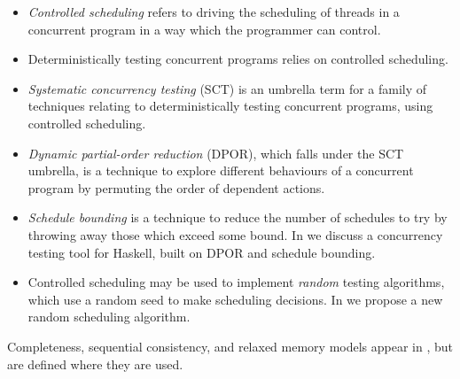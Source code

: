 \begin{itemize}
\item \emph{Controlled scheduling} refers to driving the scheduling of
  threads in a concurrent program in a way which the programmer can
  control.
\item Deterministically testing concurrent programs relies on
  controlled scheduling.
\item \emph{Systematic concurrency testing}
  (SCT)\cite{coons2013,flanagan2005,musuvathi2008,musuvathi2007} is an
  umbrella term for a family of techniques relating to
  deterministically testing concurrent programs, using controlled
  scheduling.
\item \emph{Dynamic partial-order reduction}
  (DPOR)\cite{flanagan2005,godefroid1996}, which falls under the SCT
  umbrella, is a technique to explore different behaviours of a
  concurrent program by permuting the order of dependent actions.
\item \emph{Schedule bounding}\cite{emmi2011,musuvathi2008,musuvathi2007} is
  a technique to reduce the number of schedules to try by throwing
  away those which exceed some bound.  In  we discuss
  a concurrency testing tool for Haskell, built on DPOR and schedule
  bounding.
\item Controlled scheduling may be used to implement \emph{random}
  testing algorithms, which use a random seed to make scheduling
  decisions.  In  we propose a new random
  scheduling algorithm.
\end{itemize}

Completeness, sequential consistency, and relaxed memory models appear
in , but are defined where they are used.
